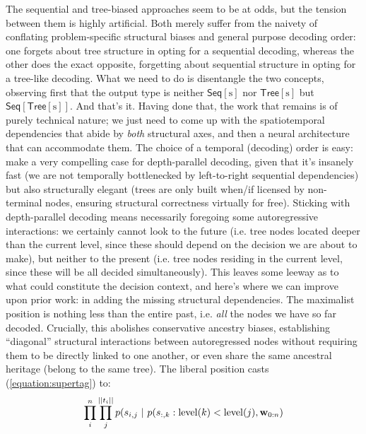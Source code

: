 The sequential and tree-biased approaches seem to be at odds, but the tension between them is highly artificial.
Both merely suffer from the naivety of conflating problem-specific structural biases and general purpose decoding order: one forgets about tree structure in opting for a sequential decoding, whereas the other does the exact opposite, forgetting about sequential structure in opting for a tree-like decoding.
What we need to do is disentangle the two concepts, observing first that the output type is neither $\mathsf{Seq}[\mathrm{s}]$ nor $\mathsf{Tree}[\mathrm{s}]$ but $\mathsf{Seq}[\mathsf{Tree}[\mathrm{s}]]$.
And that's it.
Having done that, the work that remains is of purely technical nature; we just need to come up with the spatiotemporal dependencies that abide by \textit{both} structural axes, and then a neural architecture that can accommodate them.
The choice of a temporal (decoding) order is easy: \citet{prange-etal-2021-supertagging} make a very compelling case for depth-parallel decoding, given that it's insanely fast (we are not temporally bottlenecked by left-to-right sequential dependencies) but also structurally elegant (trees are only built when/if licensed by non-terminal nodes, ensuring structural correctness virtually for free).
Sticking with depth-parallel decoding means necessarily foregoing some autoregressive interactions: we certainly cannot look to the future (i.e. tree nodes located deeper than the current level, since these should depend on the decision we are about to make), but neither to the present (i.e. tree nodes residing in the current level, since these will be all decided simultaneously).
This leaves some leeway as to what could constitute the decision context, and here's where we can improve upon prior work: in adding the missing structural dependencies.
The maximalist position is nothing less than the entire past, i.e. \textit{all} the nodes we have so far decoded.
Crucially, this abolishes conservative ancestry biases, establishing ``diagonal'' structural interactions between autoregressed nodes without requiring them to be directly linked to one another, or even share the same ancestral heritage (belong to the same tree).
The liberal position casts (\ref{equation:supertag}) to:
\begin{equation}
	\prod_i^n \prod_j^{||t_i||} p(s_{i, j} \ | \ p(s_{:, k} : \mathrm{level}(k) < \mathrm{level}(j), \wseq)
\end{equation}

